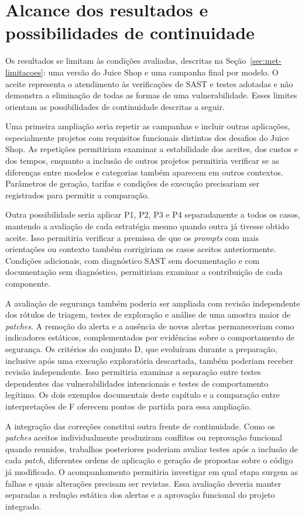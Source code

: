\section{Alcance dos resultados e possibilidades de continuidade}
\label{sec:res-alcance}

Os resultados se limitam às condições avaliadas, descritas na Seção~\ref{sec:met-limitacoes}: uma versão do Juice Shop e uma campanha final por modelo. O aceite representa o atendimento às verificações de SAST e testes adotadas e não demonstra a eliminação de todas as formas de uma vulnerabilidade. Esses limites orientam as possibilidades de continuidade descritas a seguir.

Uma primeira ampliação seria repetir as campanhas e incluir outras aplicações, especialmente projetos com requisitos funcionais distintos dos desafios do Juice Shop. As repetições permitiriam examinar a estabilidade dos aceites, dos custos e dos tempos, enquanto a inclusão de outros projetos permitiria verificar se as diferenças entre modelos e categorias também aparecem em outros contextos. Parâmetros de geração, tarifas e condições de execução precisariam ser registrados para permitir a comparação.

Outra possibilidade seria aplicar P1, P2, P3 e P4 separadamente a todos os casos, mantendo a avaliação de cada estratégia mesmo quando outra já tivesse obtido aceite. Isso permitiria verificar a premissa de que os \textit{prompts} com mais orientações ou contexto também corrigiriam os casos aceitos anteriormente. Condições adicionais, com diagnóstico SAST sem documentação e com documentação sem diagnóstico, permitiriam examinar a contribuição de cada componente.

A avaliação de segurança também poderia ser ampliada com revisão independente dos rótulos de triagem, testes de exploração e análise de uma amostra maior de \textit{patches}. A remoção do alerta e a ausência de novos alertas permaneceriam como indicadores estáticos, complementados por evidências sobre o comportamento de segurança. Os critérios do conjunto D, que evoluíram durante a preparação, inclusive após uma execução exploratória descartada, também poderiam receber revisão independente. Isso permitiria examinar a separação entre testes dependentes das vulnerabilidades intencionais e testes de comportamento legítimo. Os dois exemplos documentais deste capítulo e a comparação entre interpretações de F oferecem pontos de partida para essa ampliação.

A integração das correções constitui outra frente de continuidade. Como os \textit{patches} aceitos individualmente produziram conflitos ou reprovação funcional quando reunidos, trabalhos posteriores poderiam avaliar testes após a inclusão de cada \textit{patch}, diferentes ordens de aplicação e geração de propostas sobre o código já modificado. O acompanhamento permitiria investigar em qual etapa surgem as falhas e quais alterações precisam ser revistas. Essa avaliação deveria manter separadas a redução estática dos alertas e a aprovação funcional do projeto integrado.
